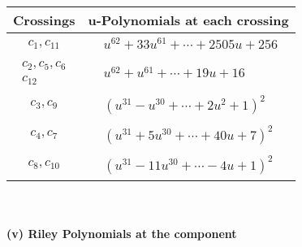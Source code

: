 \documentclass[1p]{elsarticle_modified}
\theoremstyle{definition}
\begin{document}
\begin{tabular}{m{50pt}|m{274pt}}
Crossings & \hspace{64pt}u-Polynomials at each crossing \\
\hline $$\begin{aligned}c_{1},c_{11}\end{aligned}$$&$\begin{aligned}
&u^{62}+33 u^{61}+\cdots+2505 u+256
\end{aligned}$\\
\hline $$\begin{aligned}c_{2},c_{5},c_{6}\\c_{12}\end{aligned}$$&$\begin{aligned}
&u^{62}+u^{61}+\cdots+19 u+16
\end{aligned}$\\
\hline $$\begin{aligned}c_{3},c_{9}\end{aligned}$$&$\begin{aligned}
&(u^{31}- u^{30}+\cdots+2 u^2+1)^{2}
\end{aligned}$\\
\hline $$\begin{aligned}c_{4},c_{7}\end{aligned}$$&$\begin{aligned}
&(u^{31}+5 u^{30}+\cdots+40 u+7)^{2}
\end{aligned}$\\
\hline $$\begin{aligned}c_{8},c_{10}\end{aligned}$$&$\begin{aligned}
&(u^{31}-11 u^{30}+\cdots-4 u+1)^{2}
\end{aligned}$\\
\hline
\end{tabular}\\~\\
\newpage\renewcommand{\arraystretch}{1}
\flushleft \textbf{(v) Riley Polynomials at the component}\newline \\
\end{document}
